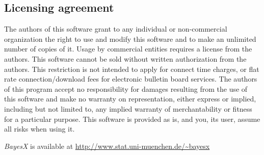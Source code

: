 {\subsection*{Licensing agreement} The authors of this software grant
to any individual or non-commercial organization the right to use and modify this software and to make an unlimited number of
copies of it. Usage by commercial entities requires a license from the authors. This software cannot be sold without written
authorization from the authors. This restriction is not intended to apply for connect time charges, or flat rate
connection/download fees for electronic bulletin board services. The authors of this program accept no responsibility for
damages resulting from the use of this software and make no warranty on representation, either express or implied, including
but not limited to, any implied warranty of merchantability or fitness for a particular purpose. This software is provided as
is, and you, its user, assume all risks when using it.

\vspace{0.5cm}

{\em BayesX} is available at { \href{http://www.stat.uni-muenchen.de/~bayesx}{http://www.stat.uni-muenchen.de/\~{}bayesx}}}
